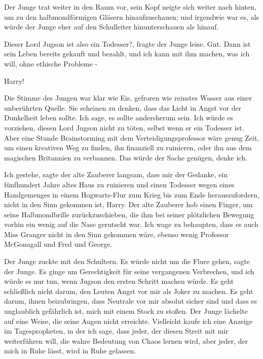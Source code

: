 Der Junge trat weiter in den Raum vor, sein Kopf neigte sich weiter nach hinten,
um zu den halbmondförmigen Gläsern hinaufzuschauen; und irgendwie war es, als
würde der Junge eher auf den Schulleiter hinunterschauen als hinauf.

\glqq{}Dieser Lord Jugson ist also ein Todesser?\grqq{}, fragte der Junge leise.
\glqq{}Gut. Dann ist sein Leben bereits gekauft und bezahlt, und ich kann mit ihm
machen, was ich will, ohne ethische Probleme -\grqq{}

\glqq{}Harry!\grqq{}

Die Stimme des Jungen war klar wie Eis, gefroren wie reinstes Wasser aus einer
unberührten Quelle. \glqq{}Sie scheinen zu denken, dass das Licht in Angst vor
der Dunkelheit leben sollte. Ich sage, es sollte andersherum sein. Ich würde es
vorziehen, diesen Lord Jugson nicht zu töten, selbst wenn er ein Todesser ist.
Aber eine Stunde Brainstorming mit dem Verteidigungsprofessor wäre genug Zeit,
um einen kreativen Weg zu finden, ihn finanziell zu ruinieren, oder ihn aus dem
magischen Britannien zu verbannen. Das würde der Sache genügen, denke
ich.\grqq{}

\glqq{}Ich gestehe\grqq{}, sagte der alte Zauberer langsam, \glqq{}dass mir der
Gedanke, ein fünfhundert Jahre altes Haus zu ruinieren und einen Todesser wegen
eines Handgemenges in einem Hogwarts-Flur zum Krieg bis zum Ende
herauszufordern, nicht in den Sinn gekommen ist, Harry.\grqq{} Der alte Zauberer
hob einen Finger, um seine Halbmondbrille zurückzuschieben, die ihm bei seiner
plötzlichen Bewegung vorhin ein wenig auf die Nase gerutscht war. \glqq{}Ich wage
zu behaupten, dass es auch Miss Granger nicht in den Sinn gekommen wäre, ebenso
wenig Professor McGonagall und Fred und George.\grqq{}

Der Junge zuckte mit den Schultern. \glqq{}Es würde nicht um die Flure
gehen\grqq{}, sagte der Junge. \glqq{}Es ginge um Gerechtigkeit für seine
vergangenen Verbrechen, und ich würde es nur tun, wenn Jugson den ersten Schritt
machen würde. Es geht schließlich nicht darum, den Leuten Angst vor mir als
Joker zu machen. Es geht darum, ihnen beizubringen, dass Neutrale vor mir
absolut sicher sind und dass es unglaublich gefährlich ist, mich mit einem Stock
zu stoßen.\grqq{} Der Junge lächelte auf eine Weise, die seine Augen nicht
erreichte. \glqq{}Vielleicht kaufe ich eine Anzeige im Tagespropheten, in der ich
sage, dass jeder, der diesen Streit mit mir weiterführen will, die wahre
Bedeutung von Chaos lernen wird, aber jeder, der mich in Ruhe lässt, wird in
Ruhe gelassen.\grqq{}


